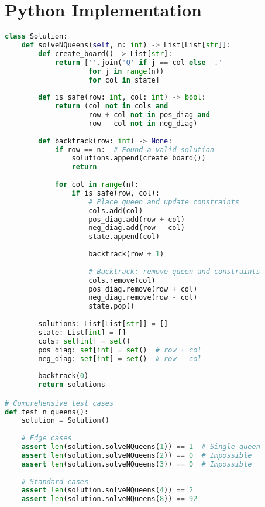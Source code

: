
\section*{Python Implementation}
\begin{fullwidth}
\begin{lstlisting}[language=Python]
class Solution:
    def solveNQueens(self, n: int) -> List[List[str]]:
        def create_board() -> List[str]:
            return [''.join('Q' if j == col else '.' 
                    for j in range(n))
                    for col in state]
        
        def is_safe(row: int, col: int) -> bool:
            return (col not in cols and
                    row + col not in pos_diag and
                    row - col not in neg_diag)
        
        def backtrack(row: int) -> None:
            if row == n:  # Found a valid solution
                solutions.append(create_board())
                return
            
            for col in range(n):
                if is_safe(row, col):
                    # Place queen and update constraints
                    cols.add(col)
                    pos_diag.add(row + col)
                    neg_diag.add(row - col)
                    state.append(col)
                    
                    backtrack(row + 1)
                    
                    # Backtrack: remove queen and constraints
                    cols.remove(col)
                    pos_diag.remove(row + col)
                    neg_diag.remove(row - col)
                    state.pop()
        
        solutions: List[List[str]] = []
        state: List[int] = []
        cols: set[int] = set()
        pos_diag: set[int] = set()  # row + col
        neg_diag: set[int] = set()  # row - col
        
        backtrack(0)
        return solutions

# Comprehensive test cases
def test_n_queens():
    solution = Solution()
    
    # Edge cases
    assert len(solution.solveNQueens(1)) == 1  # Single queen
    assert len(solution.solveNQueens(2)) == 0  # Impossible
    assert len(solution.solveNQueens(3)) == 0  # Impossible
    
    # Standard cases
    assert len(solution.solveNQueens(4)) == 2
    assert len(solution.solveNQueens(8)) == 92
\end{lstlisting}
\end{fullwidth}

